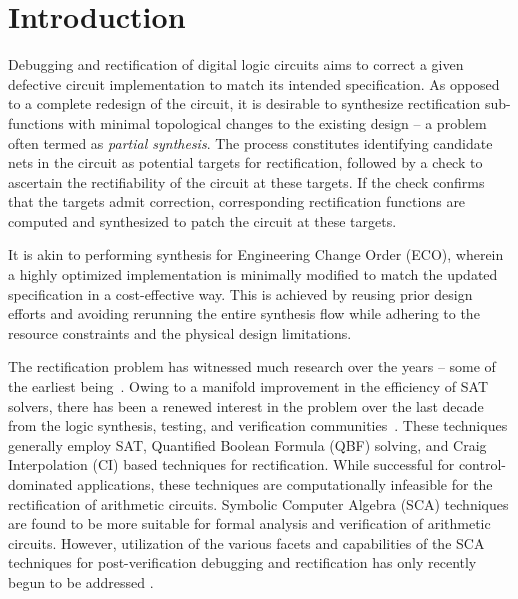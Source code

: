 \section{Introduction}
\par Debugging and rectification of digital logic circuits aims to correct
a given defective circuit implementation to match its intended
specification. As opposed to a complete redesign of the circuit, it
is desirable to synthesize rectification sub-functions with
minimal topological changes to the existing design -- a problem
often termed as {\it partial synthesis}. 
The process constitutes identifying
candidate nets in the circuit as potential targets for rectification, followed by  
a check to ascertain the rectifiability of the circuit at these targets. 
If the check confirms that the targets admit correction, corresponding rectification
functions are computed and synthesized to patch the circuit at these targets.
  
It is akin to performing synthesis for Engineering Change Order 
(ECO), wherein a highly optimized implementation is minimally modified to match the updated specification in a cost-effective way. This is achieved by reusing prior design efforts and avoiding rerunning the entire synthesis flow while adhering to the resource constraints and the physical design limitations.

The rectification problem has witnessed much research over the years -- 
some of the earliest being~\cite{Sadowska:DAC95,scholl:1,andreas:2005}.
Owing to a manifold improvement in the efficiency of SAT solvers,
there has been a renewed interest in the problem over the last decade from 
the logic synthesis, testing, and verification communities~\cite{
MF_Huang:DATE12,scholl:2,SS_Fujita:ISQED17,SS_Alan:DAC18}.
These techniques generally employ SAT, Quantified Boolean Formula (QBF) solving,
and Craig Interpolation (CI) based techniques for rectification. While
successful for control-dominated applications, these techniques are
computationally infeasible for the rectification of arithmetic circuits.
Symbolic Computer Algebra (SCA) techniques are found to be more
suitable for formal analysis and verification of arithmetic circuits.
However, utilization of the various facets and capabilities of the SCA
techniques for post-verification debugging and rectification has only
recently begun to be addressed
\cite{farimah:2017:1,MF_Rolf:ISVLSI18,Utkarsh:VLSI18,
Vkrao:FMCAD18,Utkarsh:ETS19,Vkrao:ISQED21,Vkrao:GLSVLSI21}. 



